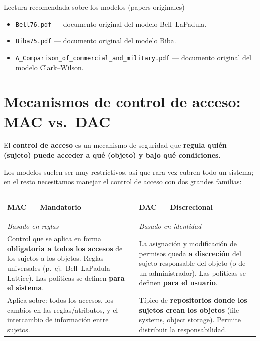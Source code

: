 \documentclass[11pt,a4paper]{article}
\newcommand{\highlight}[2]{\colorbox{#1}{\strut #2}}
\begin{document}
\begin{practbox}{Lectura recomendada sobre los modelos (papers originales)}
\begin{itemize}[leftmargin=1.4em,itemsep=1pt]
  \item \texttt{Bell76.pdf} — documento original del modelo Bell--LaPadula.
  \item \texttt{Biba75.pdf} — documento original del modelo Biba.
  \item \texttt{A\_Comparison\_of\_commercial\_and\_military.pdf} — documento original del
        modelo Clark--Wilson.
\end{itemize}
\end{practbox}

\section{Mecanismos de control de acceso: MAC vs.\ DAC}

\begin{slidebox}
\centering El \textbf{control de acceso} es un mecanismo de seguridad que \textbf{regula
quién (sujeto) puede acceder a qué (objeto) y bajo qué condiciones}.
\end{slidebox}

\medskip
Los modelos suelen ser muy restrictivos, así que rara vez cubren todo un sistema; en el resto
necesitamos manejar el control de acceso con dos grandes familias:

\begin{center}
\renewcommand{\arraystretch}{1.3}
\begin{tabular}{>{\raggedright\arraybackslash}p{6.4cm} >{\raggedright\arraybackslash}p{6.4cm}}
\toprule
\highlight{macGreen}{\bfseries MAC — Mandatorio} & \highlight{dacYellow}{\bfseries DAC — Discrecional}\\
\emph{Basado en reglas} & \emph{Basado en identidad}\\
\midrule
Control que se aplica en forma \textbf{obligatoria a todos los accesos} de los sujetos a los
objetos. Reglas universales (p.\ ej.\ Bell--LaPadula Lattice). Las políticas se definen
\textbf{para el sistema}. &
La asignación y modificación de permisos queda \textbf{a discreción} del sujeto responsable
del objeto (o de un administrador). Las políticas se definen \textbf{para el usuario}.\\[3pt]
Aplica sobre: todos los accesos, los cambios en las reglas/atributos, y el intercambio de
información entre sujetos. &
Típico de \textbf{repositorios donde los sujetos crean los objetos} (file systems, object
storage). Permite distribuir la responsabilidad.\\
\bottomrule
\end{tabular}
\end{center}
\end{document}
